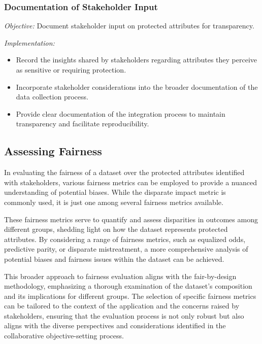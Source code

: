 \documentclass[12pt,a4paper,openright,twoside]{book}
\begin{document}
\subsubsection{Documentation of Stakeholder Input}

\emph{Objective:} Document stakeholder input on protected attributes for transparency.

\emph{Implementation:}

\begin{itemize}

    \item Record the insights shared by stakeholders regarding attributes they perceive as sensitive or requiring protection.

    \item Incorporate stakeholder considerations into the broader documentation of the data collection process.

    \item Provide clear documentation of the integration process to maintain transparency and facilitate reproducibility.

\end{itemize}

\subsection{Assessing Fairness}

In evaluating the fairness of a dataset over the protected attributes identified with stakeholders, various fairness metrics can be employed to provide a nuanced understanding of potential biases. While the disparate impact metric is commonly used, it is just one among several fairness metrics available.

These fairness metrics serve to quantify and assess disparities in outcomes among different groups, shedding light on how the dataset represents protected attributes. By considering a range of fairness metrics, such as equalized odds, predictive parity, or disparate mistreatment, a more comprehensive analysis of potential biases and fairness issues within the dataset can be achieved.

This broader approach to fairness evaluation aligns with the fair-by-design methodology, emphasizing a thorough examination of the dataset's composition and its implications for different groups. The selection of specific fairness metrics can be tailored to the context of the application and the concerns raised by stakeholders, ensuring that the evaluation process is not only robust but also aligns with the diverse perspectives and considerations identified in the collaborative objective-setting process.
\end{document}
